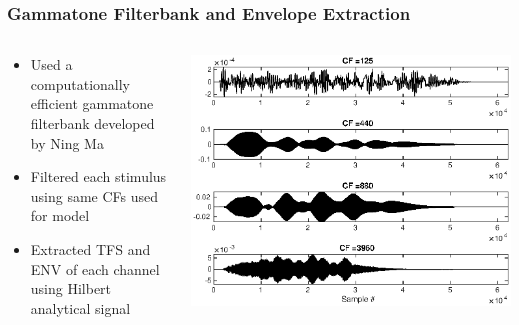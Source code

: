 \documentclass[aspectratio=1610]{beamer}
\begin{document}
\begin{frame}
\frametitle{Gammatone Filterbank and Envelope Extraction}
\begin{columns}
\begin{column}{.3\textwidth}
\begin{itemize}[label = $\blacktriangleright$]
\item Used a computationally efficient gammatone filterbank developed by Ning Ma \vspace{.5em}

\item Filtered each stimulus using same CFs used for model \vspace{.5em}

\item Extracted TFS and ENV of each channel using Hilbert analytical signal
\end{itemize}
\end{column}
\begin{column}{.7\textwidth}
\includegraphics[width = \textwidth]{filterbank}
\end{column}
\end{columns}
\end{frame}
\end{document}
